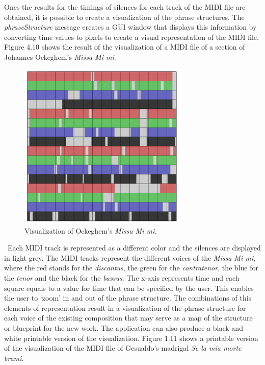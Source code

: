 Ones the results for the timings of silences for each track of the MIDI file are obtained, it is possible to create a visualization of the phrase structures. The \emph{phraseStructure} message creates a GUI window that displays this information by converting time values to pixels to create a visual representation of the MIDI file. Figure 4.10 shows the result of the visualization of a MIDI file of a section of Johannes Ockeghem's \emph{Missa Mi mi}. 
\begin{figure}[htbp] %
   \centering
   \includegraphics[width=8cm]{Chapter4/midi_phrase.tif} %
   \caption{Visualization of Ockeghem's \emph{Missa Mi mi}.}
   \label{fig:example}
\end{figure}\
Each MIDI track is represented as a different color and the silences are displayed in light grey. The MIDI tracks represent the different voices of the \emph{Missa Mi mi}, where the red stands for the \emph{discantus}, the green for the \emph{contratenor}, the blue for the \emph{tenor} and the black for the \emph{bassus}. The x-axis represents time and each square equals to a value for time that can be specified by the user. This enables the user to `zoom' in and out of the phrase structure. The combinations of this elements of representation result in a visualization of the phrase structure for each voice of the existing composition that may serve as a map of the structure or blueprint for the new work. The application can also produce a black and white printable version of the visualization. Figure 1.11 shows a printable version of the visualization of the MIDI file of Gesualdo's madrigal \emph{Se la mia morte brami}. 
